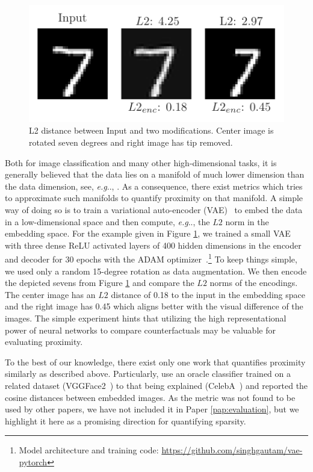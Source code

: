 \documentclass[11pt,a4paper,twoside,openright,final]{memoir}
\makeatletter
\DeclareRobustCommand\onedot{\futurelet\@let@token\@onedot}
\def\@onedot{\ifx\@let@token.\else.\null\fi\xspace}
\def\eg{\emph{e.g}\onedot} \def\Eg{\emph{E.g}\onedot}
\newcommand*{\paperref}[1]{Paper \hyperref[#1]{\ref{#1}}}
\makeatother
\begin{document}
\begin{figure}
    \centering
    \includegraphics{graphics/l2-example.pdf}
    \caption{L2 distance between Input and two modifications. Center image is rotated seven degrees and right image has tip removed.}
    \label{fig:l2-example}
\end{figure}

Both for image classification and many other high-dimensional tasks, it is generally believed that the data lies on a manifold of much lower dimension than the data dimension, see, \eg, \cite[Sec. 3.11.3]{Goodfellow-et-al-2016}.
As a consequence, there exist metrics which tries to approximate such manifolds to quantify proximity on that manifold.
A simple way of doing so is to train a variational auto-encoder (VAE)~\cite{vae} to embed the data in a low-dimensional space and then compute, \eg, the $L2$ norm in the embedding space.
For the example given in Figure \ref{fig:l2-example}, we trained a small VAE with three dense ReLU activated layers of 400 hidden dimensions in the encoder and decoder for 30 epochs with the ADAM optimizer~\cite{adam}.\footnote{Model architecture and training code: \url{https://github.com/singhgautam/vae-pytorch}}
To keep things simple, we used only a random 15-degree rotation as data augmentation.
We then encode the depicted sevens from Figure \ref{fig:l2-example} and compare the $L2$ norms of the encodings.
The center image has an $L2$ distance of 0.18 to the input in the embedding space and the right image has 0.45 which aligns better with the visual difference of the images.
The simple experiment hints that utilizing the high representational power of neural networks to compare counterfactuals may be valuable for evaluating proximity.

To the best of our knowledge, there exist only one work that quantifies proximity similarly as described above.
Particularly, \citet{Rodriguez2021} use an oracle classifier trained on a related dataset (VGGFace2~\cite{vgg2faces}) to that being explained (CelebA~\cite{celeba}) and reported the cosine distances between embedded images.
As the metric was not found to be used by other papers, we have not included it in \paperref{pap:evaluation}, but we highlight it here as a promising direction for quantifying sparsity.
\end{document}
